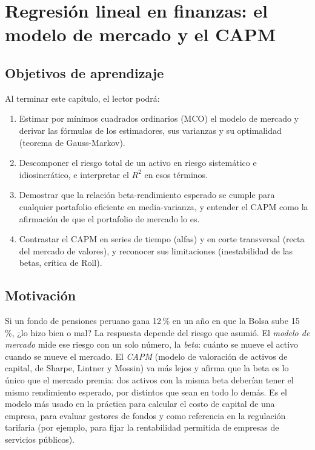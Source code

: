 \chapter{Regresión lineal en finanzas: el modelo de mercado y el CAPM}\label{cap:capm}

\section*{Objetivos de aprendizaje}
Al terminar este capítulo, el lector podrá:
\begin{enumerate}[label=\arabic*.,leftmargin=*]
  \item Estimar por mínimos cuadrados ordinarios (MCO) el modelo de mercado y derivar las fórmulas de los
        estimadores, sus varianzas y su optimalidad (teorema de Gauss-Markov).
  \item Descomponer el riesgo total de un activo en riesgo sistemático e idiosincrático, e interpretar el
        $R^2$ en esos términos.
  \item Demostrar que la relación beta-rendimiento esperado se cumple para cualquier portafolio eficiente
        en media-varianza, y entender el CAPM como la afirmación de que el portafolio de mercado lo es.
  \item Contrastar el CAPM en series de tiempo (alfas) y en corte transversal (recta del mercado de
        valores), y reconocer sus limitaciones (inestabilidad de las betas, crítica de Roll).
\end{enumerate}

\section*{Motivación}
Si un fondo de pensiones peruano gana 12\,\% en un año en que la Bolsa sube 15\,\%, ¿lo hizo bien o mal?
La respuesta depende del riesgo que asumió. El \emph{modelo de mercado} mide ese riesgo con un solo
número, la \emph{beta}: cuánto se mueve el activo cuando se mueve el mercado. El \emph{CAPM} (modelo de
valoración de activos de capital, de Sharpe, Lintner y Mossin) va más lejos y afirma que la beta es lo
único que el mercado premia: dos activos con la misma beta deberían tener el mismo rendimiento esperado,
por distintos que sean en todo lo demás. Es el modelo más usado en la práctica para calcular el costo de
capital de una empresa, para evaluar gestores de fondos y como referencia en la regulación tarifaria
(por ejemplo, para fijar la rentabilidad permitida de empresas de servicios públicos).

